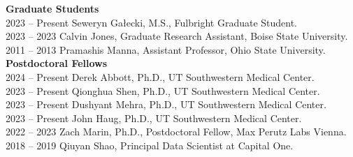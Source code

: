 \textbf{Graduate Students} \\
2023 -- Present \hspace{14pt} Seweryn Gałecki, M.S., Fulbright Graduate Student. \\
2023 -- 2023 \hspace{28pt} Calvin Jones, Graduate Research Assistant, Boise State University. \\
2011 -- 2013 \hspace{28pt} Pramashis Manna, Assistant Professor, Ohio State University. \\

\textbf{Postdoctoral Fellows} \\
2024 -- Present \hspace{14pt} Derek Abbott, Ph.D., UT Southwestern Medical Center. \\
2023 -- Present \hspace{14pt} Qionghua Shen, Ph.D., UT Southwestern Medical Center. \\
2023 -- Present \hspace{14pt} Dushyant Mehra, Ph.D., UT Southwestern Medical Center. \\
2023 -- Present \hspace{14pt} John Haug, Ph.D., UT Southwestern Medical Center. \\
2022 -- 2023 \hspace{28pt} Zach Marin, Ph.D., Postdoctoral Fellow, Max Perutz Labs Vienna. \\
2018 -- 2019 \hspace{28pt} Qiuyan Shao, Principal Data Scientist at Capital One. \\

